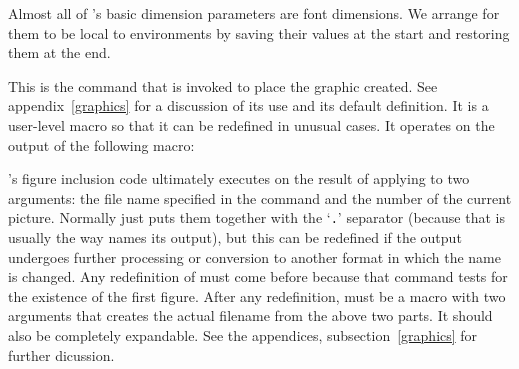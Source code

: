 \documentclass[letterpaper]{article}
\begin{document}
Almost all of \mfp{}'s basic dimension parameters are font dimensions.
We arrange for them to be local to  environments by saving
their values at the start and restoring them at the end.

\begin{cd}
%
\end{cd}

This is the command that is invoked to place the graphic created. See
appendix~\ref{graphics} for a discussion of its use and its default
definition. It is a user-level macro so that it can be redefined in
unusual cases. It operates on the output of the following macro:

\begin{cd}
%
\end{cd}

\Mfp's figure inclusion code ultimately executes
 on the result of applying  to two
arguments: the file name specified in the  command
and the number of the current picture. Normally  just
puts them together with the `\texttt{.}' separator (because that is
usually the way \MP{} names its output), but this can be redefined if
the \MP{} output undergoes further processing or conversion to another
format in which the name is changed. Any redefinition of
 must come before  because that
command tests for the existence of the first figure. After any
redefinition,  must be a macro with two arguments that
creates the actual filename from the above two parts. It should also be
completely expandable. See the appendices, subsection~\ref{graphics} for
further dicussion.

\begin{cd}
%
\end{cd}
\end{document}
